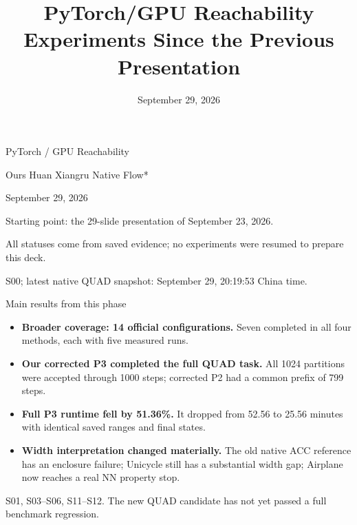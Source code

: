 \documentclass[aspectratio=169,11pt]{beamer}
\title{PyTorch/GPU Reachability Experiments Since the Previous Presentation}
\date{September 29, 2026}
\newcommand{\src}[1]{\par\vfill{\fontsize{7}{9}\selectfont\color{gray}#1\par}}
\begin{document}
\begin{frame}[t]{PyTorch / GPU Reachability}
\relax
\relax
\vspace{0.35cm}{\LARGE\bfseries Experimental progress since the previous presentation}\par{}
\vspace{0.45cm}{\large QUAD, ARCH-COMP, and four-way comparisons of time and width}\par{}
\vspace{0.65cm}Ours \quad Huan \quad Xiangru \quad Native Flow*\par{}
\vspace{0.4cm}September 29, 2026\par{}
\vfill Starting point: the 29-slide presentation of September 23, 2026.\par{}
All statuses come from saved evidence; no experiments were resumed to prepare this deck.
\src{S00; latest native QUAD snapshot: September 29, 20:19:53 China time.}
\end{frame}

\begin{frame}[t]{Main results from this phase}
\relax
\relax
\begin{itemize}
\item \textbf{Broader coverage: 14 official configurations.} Seven completed in all four methods, each with five measured runs.
\item \textbf{Our corrected P3 completed the full QUAD task.} All 1024 partitions were accepted through 1000 steps; corrected P2 had a common prefix of 799 steps.
\item \textbf{Full P3 runtime fell by 51.36\%.} It dropped from 52.56 to 25.56 minutes with identical saved ranges and final states.
\item \textbf{Width interpretation changed materially.} The old native ACC reference has an enclosure failure; Unicycle still has a substantial width gap; Airplane now reaches a real NN property stop.
\end{itemize}
\src{S01, S03–S06, S11–S12. The new QUAD candidate has not yet passed a full benchmark regression.}
\end{frame}
\end{document}

